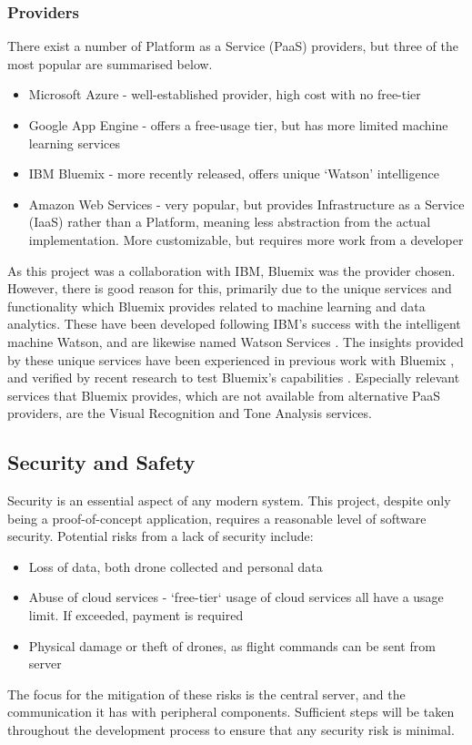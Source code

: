 \documentclass{article}
\begin{document}
\subsubsection{Providers}
There exist a number of Platform as a Service (PaaS) providers, but three of the most popular are summarised below.
\begin{itemize}
    \item Microsoft Azure - well-established provider, high cost with no free-tier
    \item Google App Engine - offers a free-usage tier, but has more limited machine learning services
    \item IBM Bluemix - more recently released, offers unique `Watson' intelligence
	\item Amazon Web Services - very popular, but provides Infrastructure as a Service (IaaS) rather than a Platform, meaning less abstraction from the actual implementation. More customizable, but requires more work from a developer
\end{itemize}
As this project was a collaboration with IBM, Bluemix was the provider chosen. However, there is good reason for this, primarily due to the unique services and functionality which Bluemix provides related to machine learning and data analytics. These have been developed following IBM's success with the intelligent machine Watson, and are likewise named Watson Services \cite{Watson}. The insights provided by these unique services have been experienced in previous work with Bluemix \cite{EdgeOfSpace}, and verified by recent research to test Bluemix's capabilities \cite{Sentiment}. Especially relevant services that Bluemix provides, which are not available from alternative PaaS providers, are the Visual Recognition and Tone Analysis services.

\subsection{Security and Safety}
Security is an essential aspect of any modern system. This project, despite only being a proof-of-concept application, requires a reasonable level of software security. Potential risks from a lack of security include:
\begin{itemize}
	\item Loss of data, both drone collected and personal data
	\item Abuse of cloud services - `free-tier` usage of cloud services all have a usage limit. If exceeded, payment is required
	\item Physical damage or theft of drones, as flight commands can be sent from server
\end{itemize}
The focus for the mitigation of these risks is the central server, and the communication it has with peripheral components. Sufficient steps will be taken throughout the development process to ensure that any security risk is minimal.
\end{document}
